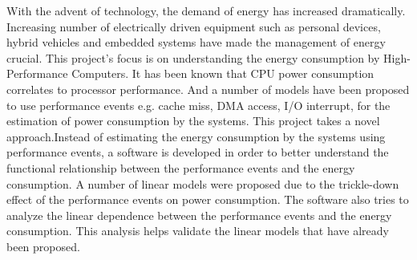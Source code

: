 With the advent of technology, the demand of energy has increased dramatically. Increasing number of electrically driven equipment such as personal devices, hybrid vehicles and embedded systems have made the management of energy crucial. This project’s focus is on understanding the energy consumption by High-Performance Computers. It has been known that CPU power consumption correlates to processor performance. And a number of models have been proposed to use performance events e.g. cache miss, DMA access, I/O interrupt, for the estimation of power consumption by the systems. This project takes a novel approach.Instead of estimating the energy consumption by the systems using performance events, a software is developed in order to better understand the functional relationship between the performance events and the energy consumption. A number of linear models were proposed due to the trickle-down effect of the performance events on power consumption\cite{gilberto2005power}. The software also tries to analyze the linear dependence between the performance events and the energy consumption. This analysis helps validate the linear models that have already been proposed.